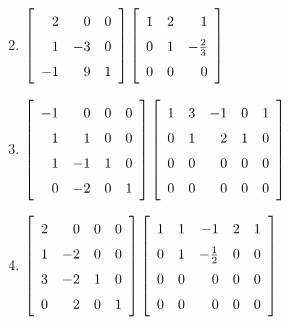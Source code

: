 \begin{multicols}{2}
\begin{ex}
\begin{enumerate}[label={\alph*.}]
\end{enumerate}
\begin{sol}
\begin{enumerate}[label={\alph*.}]
\setcounter{enumi}{1}
\item $\leftB \begin{array}{rrr}
2 & 0 & 0 \\
1 & -3 & 0 \\
-1 & 9 & 1
\end{array} \rightB \leftB \def\arraystretch{1.5}\begin{array}{rrr}
1 & 2 & 1 \\
0 & 1 & -\frac{2}{3} \\
0 & 0 & 0
\end{array} \rightB$

\setcounter{enumi}{3}
\item $\leftB \begin{array}{rrrr}
-1 & 0 & 0 & 0 \\
1 & 1 & 0 & 0 \\
1 & -1 & 1 & 0 \\
0 & -2 & 0 & 1
\end{array} \rightB \leftB \begin{array}{rrrrr}
1 & 3 & -1 & 0 & 1 \\
0 & 1 & 2 & 1 & 0 \\
0 & 0 & 0 & 0 & 0 \\
0 & 0 & 0 & 0 & 0
\end{array} \rightB$

\setcounter{enumi}{5}
\item $\leftB \begin{array}{rrrr}
2 & 0 & 0 & 0 \\
1 & -2 & 0 & 0 \\
3 & -2 & 1 & 0 \\
0 & 2 & 0 & 1
\end{array} \rightB \leftB \def\arraystretch{1.5}\begin{array}{rrrrr}
1 & 1 & -1 & 2 & 1 \\
0 & 1 & -\frac{1}{2} & 0 & 0 \\
0 & 0 & 0 & 0 & 0 \\
0 & 0 & 0 & 0 & 0
\end{array} \rightB$

\end{enumerate}
\end{sol}
\end{ex}


\end{multicols}
